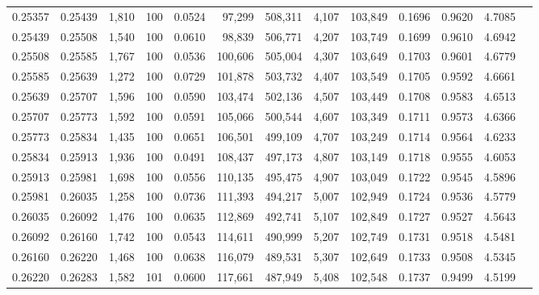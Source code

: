 \begin{tabular}{rrrrrrrrrrrrr}
0.25357 & 0.25439 & 1,810 & 100 &                                     0.0524 &  97,299 & 508,311 &   4,107 & 103,849 & 0.1696 & 0.9620 & 4.7085 \\
0.25439 & 0.25508 & 1,540 & 100 &                                     0.0610 &  98,839 & 506,771 &   4,207 & 103,749 & 0.1699 & 0.9610 & 4.6942 \\
0.25508 & 0.25585 & 1,767 & 100 &                                     0.0536 & 100,606 & 505,004 &   4,307 & 103,649 & 0.1703 & 0.9601 & 4.6779 \\
0.25585 & 0.25639 & 1,272 & 100 &                                     0.0729 & 101,878 & 503,732 &   4,407 & 103,549 & 0.1705 & 0.9592 & 4.6661 \\
0.25639 & 0.25707 & 1,596 & 100 &                                     0.0590 & 103,474 & 502,136 &   4,507 & 103,449 & 0.1708 & 0.9583 & 4.6513 \\
0.25707 & 0.25773 & 1,592 & 100 &                                     0.0591 & 105,066 & 500,544 &   4,607 & 103,349 & 0.1711 & 0.9573 & 4.6366 \\
0.25773 & 0.25834 & 1,435 & 100 &                                     0.0651 & 106,501 & 499,109 &   4,707 & 103,249 & 0.1714 & 0.9564 & 4.6233 \\
0.25834 & 0.25913 & 1,936 & 100 &                                     0.0491 & 108,437 & 497,173 &   4,807 & 103,149 & 0.1718 & 0.9555 & 4.6053 \\
0.25913 & 0.25981 & 1,698 & 100 &                                     0.0556 & 110,135 & 495,475 &   4,907 & 103,049 & 0.1722 & 0.9545 & 4.5896 \\
0.25981 & 0.26035 & 1,258 & 100 &                                     0.0736 & 111,393 & 494,217 &   5,007 & 102,949 & 0.1724 & 0.9536 & 4.5779 \\
0.26035 & 0.26092 & 1,476 & 100 &                                     0.0635 & 112,869 & 492,741 &   5,107 & 102,849 & 0.1727 & 0.9527 & 4.5643 \\
0.26092 & 0.26160 & 1,742 & 100 &                                     0.0543 & 114,611 & 490,999 &   5,207 & 102,749 & 0.1731 & 0.9518 & 4.5481 \\
0.26160 & 0.26220 & 1,468 & 100 &                                     0.0638 & 116,079 & 489,531 &   5,307 & 102,649 & 0.1733 & 0.9508 & 4.5345 \\
0.26220 & 0.26283 & 1,582 & 101 &                                     0.0600 & 117,661 & 487,949 &   5,408 & 102,548 & 0.1737 & 0.9499 & 4.5199 \\

\end{tabular}
